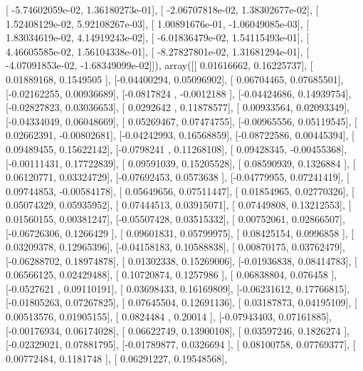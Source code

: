 \documentclass{article}
\begin{document}
       [ -5.74602059e-02,   1.36180273e-01],
       [ -2.06707818e-02,   1.38302677e-02],
       [  1.52408129e-02,   5.92108267e-03],
       [  1.00891676e-01,  -1.06049085e-03],
       [  1.83034619e-02,   4.14919243e-02],
       [ -6.01836479e-02,   1.54115493e-01],
       [  4.46605585e-02,   1.56104338e-01],
       [ -8.27827801e-02,   1.31681294e-01],
       [ -4.07091853e-02,  -1.68349099e-02]]), array([[ 0.01616662,  0.16225737],
       [ 0.01889168,  0.1549505 ],
       [-0.04400294,  0.05096902],
       [ 0.06704465,  0.07685501],
       [-0.02162255,  0.00936689],
       [-0.0817824 , -0.0012188 ],
       [-0.04424686,  0.14939754],
       [-0.02827823,  0.03036653],
       [ 0.0292642 ,  0.11878577],
       [ 0.00933564,  0.02093349],
       [-0.04334049,  0.06048669],
       [ 0.05269467,  0.07474755],
       [-0.00965556,  0.05119545],
       [ 0.02662391, -0.00802681],
       [-0.04242993,  0.16568859],
       [-0.08722586,  0.00445394],
       [ 0.09489455,  0.15622142],
       [-0.0798241 ,  0.11268108],
       [ 0.09428345, -0.00455368],
       [-0.00111431,  0.17722839],
       [ 0.09591039,  0.15205528],
       [ 0.08590939,  0.1326884 ],
       [ 0.06120771,  0.03324729],
       [-0.07692453,  0.0573638 ],
       [-0.04779955,  0.07241419],
       [ 0.09744853, -0.00584178],
       [ 0.05649656,  0.07511447],
       [ 0.01854965,  0.02770326],
       [ 0.05074329,  0.05935952],
       [ 0.07444513,  0.03915071],
       [ 0.07449808,  0.13212553],
       [ 0.01560155,  0.00381247],
       [-0.05507428,  0.03515332],
       [ 0.00752061,  0.02866507],
       [-0.06726306,  0.1266429 ],
       [ 0.09601831,  0.05799975],
       [ 0.08425154,  0.0996858 ],
       [ 0.03209378,  0.12965396],
       [-0.04158183,  0.10588838],
       [ 0.00870175,  0.03762479],
       [-0.06288702,  0.18974878],
       [ 0.01302338,  0.15269006],
       [-0.01936838,  0.08414783],
       [ 0.06566125,  0.02429488],
       [ 0.10720874,  0.1257986 ],
       [ 0.06838804,  0.076458  ],
       [-0.0527621 ,  0.09110191],
       [ 0.03698433,  0.16169809],
       [-0.06231612,  0.17766815],
       [-0.01805263,  0.07267825],
       [ 0.07645504,  0.12691136],
       [ 0.03187873,  0.04195109],
       [ 0.00513576,  0.01905155],
       [ 0.0824484 ,  0.20014   ],
       [-0.07943403,  0.07161885],
       [-0.00176934,  0.06174028],
       [ 0.06622749,  0.13900108],
       [ 0.03597246,  0.1826274 ],
       [-0.02329021,  0.07881795],
       [-0.01789877,  0.0326694 ],
       [ 0.08100758,  0.07769377],
       [ 0.00772484,  0.1181748 ],
       [ 0.06291227,  0.19548568],
\end{document}
